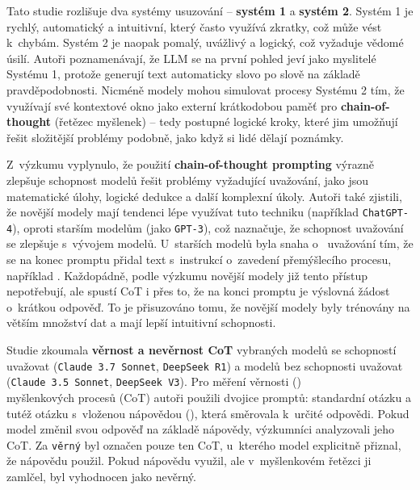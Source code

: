 \documentclass[czech, bc, kiv, he, iso690numb, pdf]{fasthesis}
\begin{document}
Tato studie \cite{llm-gpt-reasoning} rozlišuje dva systémy usuzování -- \textbf{systém 1} a \textbf{systém 2}. Systém 1 je rychlý, automatický a intuitivní, který často využívá zkratky, což může vést k~chybám. Systém 2 je naopak pomalý, uvážlivý a logický, což vyžaduje vědomé úsilí. Autoři poznamenávají, že LLM se na první pohled jeví jako myslitelé Systému 1, protože generují text automaticky slovo po slově na základě pravděpodobnosti. Nicméně modely mohou simulovat procesy Systému 2 tím, že využívají své kontextové okno jako externí krátkodobou paměť pro \textbf{chain-of-thought} (řetězec myšlenek) -- tedy postupné logické kroky, které jim umožňují řešit složitější problémy podobně, jako když si lidé dělají poznámky.

Z~výzkumu vyplynulo, že použití \textbf{chain-of-thought prompting} výrazně zlepšuje schopnost modelů řešit problémy vyžadující uvažování, jako jsou matematické úlohy, logické dedukce a další komplexní úkoly. Autoři také zjistili, že novější modely mají tendenci lépe využívat tuto techniku (například \verb"ChatGPT-4"), oproti starším modelům (jako \verb"GPT-3"), což naznačuje, že schopnost uvažování se zlepšuje s~vývojem modelů. U~starších modelů byla snaha o~ uvažování tím, že se na konec promptu přidal text s~instrukcí o~zavedení přemýšlecího procesu, například . Každopádně, podle výzkumu novější modely již tento přístup nepotřebují, ale spustí CoT i přes to, že na konci promptu je výslovná žádost o~krátkou odpověď. To je přisuzováno tomu, že novější modely byly trénovány na větším množství dat a mají lepší intuitivní schopnosti.

Studie \cite{anthropic-reasoning-paper} zkoumala \textbf{věrnost a nevěrnost CoT} vybraných modelů se schopností uvažovat (\verb"Claude 3.7 Sonnet", \verb"DeepSeek R1") a modelů bez schopnosti uvažovat (\verb"Claude 3.5 Sonnet", \verb"DeepSeek V3"). Pro měření věrnosti () \\ myšlenkových procesů (CoT) autoři použili dvojice promptů: standardní otázku a tutéž otázku s~vloženou nápovědou (), která směrovala k~určité odpovědi. Pokud model změnil svou odpověď na základě nápovědy, výzkumníci analyzovali jeho CoT. Za \verb"věrný" byl označen pouze ten CoT, u~kterého model explicitně přiznal, že nápovědu použil. Pokud nápovědu využil, ale v~myšlenkovém řetězci ji zamlčel, byl vyhodnocen jako nevěrný.
\end{document}
